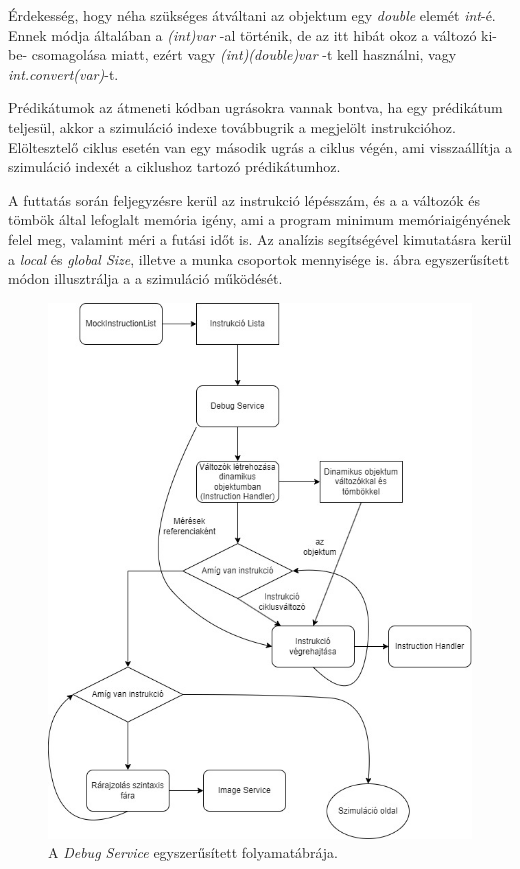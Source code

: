 Érdekesség, hogy néha szükséges átváltani az objektum egy \textit{double} elemét \textit{int}-é. Ennek módja általában a \textit{(int)var} -al történik, de az itt hibát okoz a változó ki-be- csomagolása miatt, ezért vagy \textit{(int)(double)var} -t kell használni, vagy \textit{int.convert(var)}-t.

Prédikátumok az átmeneti kódban ugrásokra vannak bontva, ha egy prédikátum teljesül, akkor a szimuláció indexe továbbugrik a megjelölt instrukcióhoz. Elöltesztelő ciklus esetén van egy második ugrás a ciklus végén, ami visszaállítja a szimuláció indexét a ciklushoz tartozó prédikátumhoz.

A futtatás során feljegyzésre kerül az instrukció lépésszám, és a a változók és tömbök által lefoglalt memória igény, ami a program minimum memóriaigényének felel meg, valamint méri a futási időt is. Az analízis segítségével kimutatásra kerül a \textit{local} és \textit{global Size}, illetve a munka csoportok mennyisége is.  ábra egyszerűsített módon illusztrálja a a szimuláció működését.

\begin{figure}[h]
\centering
\includegraphics[scale=0.5]{images/SimpleDebug.jpg}
\caption{A \textit{Debug Service} egyszerűsített folyamatábrája.}
\label{fig:debugflow}
\end{figure}

